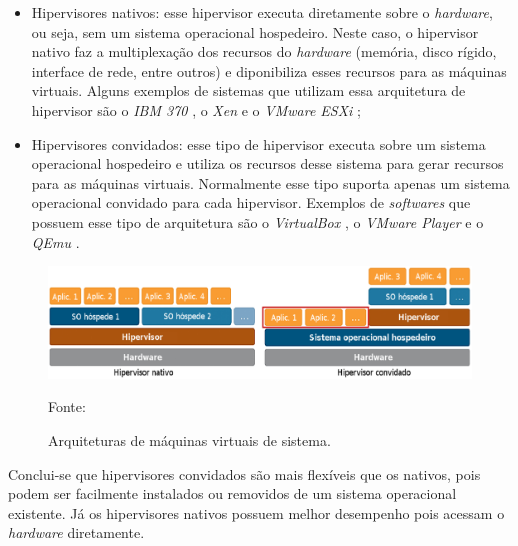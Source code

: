\begin{itemize}
 \item Hipervisores nativos: esse hipervisor executa diretamente sobre o \textit{hardware}, ou seja, sem um sistema operacional
 hospedeiro. Neste caso, o hipervisor nativo faz a multiplexação dos recursos do \textit{hardware} (memória, disco rígido, interface de rede, 
 entre outros) e diponibiliza esses recursos para as máquinas virtuais. Alguns exemplos de sistemas que utilizam essa arquitetura de hipervisor 
 são o \textit{IBM 370} \cite{ibm370}, o \textit{Xen} \cite{xen} e o \textit{VMware ESXi} \cite{vmwareesxi};
 \item Hipervisores convidados: esse tipo de hipervisor executa sobre um sistema operacional hospedeiro e utiliza os recursos desse sistema 
 para gerar recursos para as máquinas virtuais. Normalmente esse tipo suporta apenas um sistema operacional convidado para cada 
 hipervisor. Exemplos de \textit{softwares} que possuem esse tipo de arquitetura são o \textit{VirtualBox} \cite{virtualbox}, 
 o \textit{VMware Player} \cite{vmwareplayer} e o \textit{QEmu} \cite{qemu}.
\end{itemize}

\begin{figure}[h!]
 \centering
 \includegraphics[width=430px]{img/vms_arquiteturas.eps}
 \caption{Arquiteturas de máquinas virtuais de sistema.}
 \label{fig:vms_arquiteturas}
 Fonte: \citet{macedo2016}
\end{figure}

Conclui-se que hipervisores convidados são mais flexíveis que os nativos, pois podem ser facilmente instalados ou removidos de um sistema
operacional existente. Já os hipervisores nativos possuem melhor desempenho pois acessam o \textit{hardware} diretamente.

